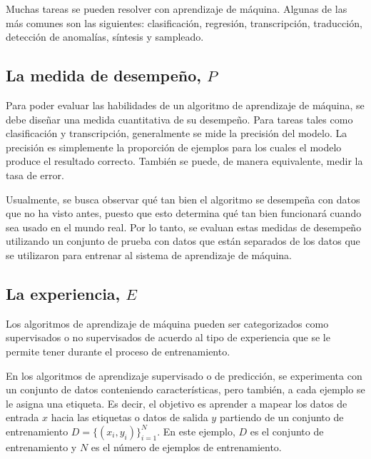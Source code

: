 \vspace{1em}

Muchas tareas se pueden resolver con aprendizaje de máquina. Algunas de las más comunes son las siguientes: clasificación, regresión, transcripción, traducción, detección de anomalías, síntesis y sampleado.
\cite{goodfellow-et-al-2016}

\subsection{La medida de desempeño, $P$}
Para poder evaluar las habilidades de un algoritmo de aprendizaje de máquina, se debe diseñar una medida cuantitativa de su desempeño. Para tareas tales como clasificación y transcripción, generalmente se mide la precisión del modelo. La precisión es simplemente la proporción de ejemplos para los cuales el modelo produce el resultado correcto. También se puede, de manera equivalente, medir la tasa de error. 

\vspace{1em}

Usualmente, se busca observar qué tan bien el algoritmo se desempeña con datos que no ha visto antes, puesto que esto determina qué tan bien funcionará cuando sea usado en el mundo real. Por lo tanto, se evaluan estas medidas de desempeño utilizando un conjunto de prueba con datos que están separados de los datos que se utilizaron para entrenar al sistema de aprendizaje de máquina. \cite{goodfellow-et-al-2016}

\subsection{La experiencia, $E$}
Los algoritmos de aprendizaje de máquina pueden ser categorizados como supervisados o no supervisados de acuerdo al tipo de experiencia que se le permite tener durante el proceso de entrenamiento.

\vspace{1em}

En los algoritmos de aprendizaje supervisado o de predicción, se experimenta con un conjunto de datos conteniendo características, pero también, a cada ejemplo se le asigna una etiqueta. Es decir, el objetivo es aprender a mapear los datos de entrada $x$ hacia las etiquetas o datos de salida $y$ partiendo de un conjunto de entrenamiento $D = \{(x_i, y_i)\}_{i=1}^N$. En este ejemplo, $D$ es el conjunto de entrenamiento y $N$ es el número de ejemplos de entrenamiento. \cite{Murphy:2012:MLP:2380985}

